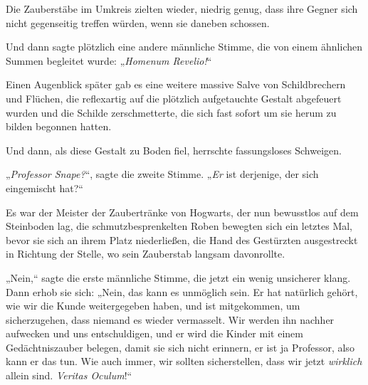 Die Zauberstäbe im Umkreis zielten wieder, niedrig genug, dass ihre Gegner sich nicht gegenseitig treffen würden, wenn sie daneben schossen.

Und dann sagte plötzlich eine andere männliche Stimme, die von einem ähnlichen Summen begleitet wurde: „\emph{Homenum Revelio!}“

Einen Augenblick später gab es eine weitere massive Salve von Schildbrechern und Flüchen, die reflexartig auf die plötzlich aufgetauchte Gestalt abgefeuert wurden und die Schilde zerschmetterte, die sich fast sofort um sie herum zu bilden begonnen hatten.

Und dann, als diese Gestalt zu Boden fiel, herrschte fassungsloses Schweigen.

„\emph{Professor Snape?}“, sagte die zweite Stimme. „\emph{Er} ist derjenige, der sich eingemischt hat?“

Es war der Meister der Zaubertränke von Hogwarts, der nun bewusstlos auf dem Steinboden lag, die schmutzbesprenkelten Roben bewegten sich ein letztes Mal, bevor sie sich an ihrem Platz niederließen, die Hand des Gestürzten ausgestreckt in Richtung der Stelle, wo sein Zauberstab langsam davonrollte.

„Nein,“ sagte die erste männliche Stimme, die jetzt ein wenig unsicherer klang. Dann erhob sie sich: „Nein, das kann es unmöglich sein. Er hat natürlich gehört, wie wir die Kunde weitergegeben haben, und ist mitgekommen, um sicherzugehen, dass niemand es wieder vermasselt. Wir werden ihn nachher aufwecken und uns entschuldigen, und er wird die Kinder mit einem Gedächtniszauber belegen, damit sie sich nicht erinnern, er ist ja Professor, also kann er das tun. Wie auch immer, wir sollten sicherstellen, dass wir jetzt \emph{wirklich} allein sind. \emph{Veritas Oculum}!“

